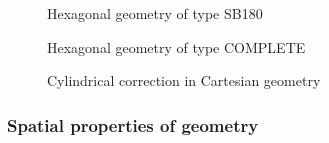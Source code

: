 \begin{figure}[!]  
\begin{center} 
\epsfxsize=11cm
\centerline{ }
\parbox{14cm}{\caption{Hexagonal geometry of type SB180}\label{fig:sb180}}   
\end{center}  
\end{figure}

\begin{figure}[!]  
\begin{center} 
\epsfxsize=10cm
\centerline{ }
\parbox{14cm}{\caption{Hexagonal geometry of type
COMPLETE}\label{fig:compl}}    
\end{center}  
\end{figure}

\begin{figure}[!]
\begin{center} 
\epsfxsize=6cm
\centerline{ }
\parbox{14cm}{\caption{Cylindrical correction in Cartesian geometry}
\label{fig:corr}} 
\end{center} 
\end{figure}

\clearpage
\subsubsection{Spatial properties of geometry}\label{sect:descSP}
                                                  
